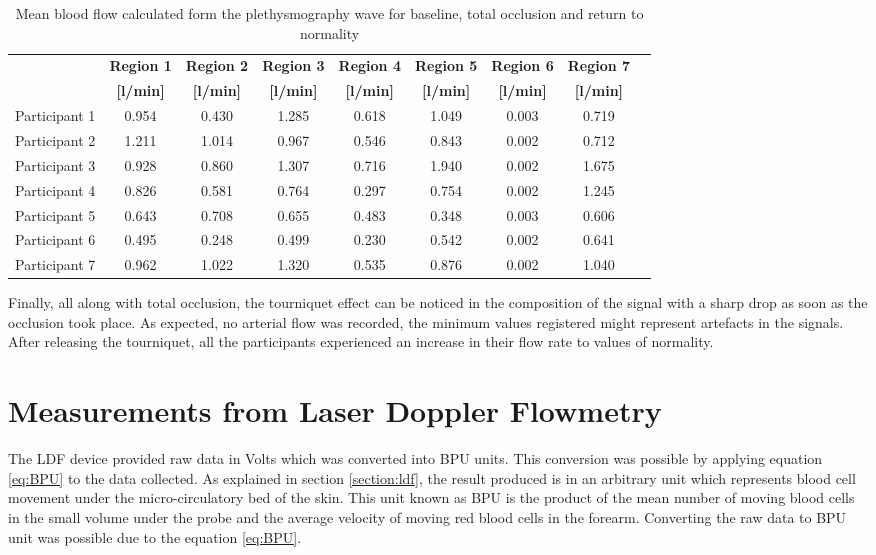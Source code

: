 \begin{table}[!htb]
	\caption{Mean blood flow calculated form the plethysmography wave for baseline, total occlusion and return to normality}
	\label{tbl:DU flow}
	\centering \small
	\begin{tabular}{lcccccccc}
		\toprule
		& \textbf{Region 1}
		& \textbf{Region 2}
		& \textbf{Region 3}
		& \textbf{Region 4}
		& \textbf{Region 5}
		& \textbf{Region 6}
		& \textbf{Region 7} \\
		& \textbf{[\si[per-mode=symbol]{\litre\per\minute}]}
		& \textbf{[\si[per-mode=symbol]{\litre\per\minute}]}
		& \textbf{[\si[per-mode=symbol]{\litre\per\minute}]}
		& \textbf{[\si[per-mode=symbol]{\litre\per\minute}]}
		& \textbf{[\si[per-mode=symbol]{\litre\per\minute}]}
		& \textbf{[\si[per-mode=symbol]{\litre\per\minute}]}
		& \textbf{[\si[per-mode=symbol]{\litre\per\minute}]} \\\midrule	
		Participant 1 & 0.954 & 0.430 & 1.285 & 0.618 & 1.049 & 0.003 & 0.719 \\
		Participant 2 & 1.211 & 1.014 & 0.967 & 0.546 & 0.843 & 0.002 & 0.712 \\  
		Participant 3 & 0.928 & 0.860 & 1.307 & 0.716 & 1.940 & 0.002 & 1.675 \\  
		Participant 4 & 0.826 & 0.581 & 0.764 & 0.297 & 0.754 & 0.002 & 1.245 \\  
		Participant 5 & 0.643 & 0.708 & 0.655 & 0.483 & 0.348 & 0.003 & 0.606 \\  
		Participant 6 & 0.495 & 0.248 & 0.499 & 0.230 & 0.542 & 0.002 & 0.641 \\  
		Participant 7 & 0.962 & 1.022 & 1.320 & 0.535 & 0.876 & 0.002 & 1.040 \\  	 
		\bottomrule
	\end{tabular}
\end{table}

Finally, all along with total occlusion, the tourniquet effect can be noticed in the composition of the signal with a sharp drop as soon as the occlusion took place. As expected, no arterial flow was recorded, the minimum values registered might represent artefacts in the signals. After releasing the tourniquet, all the participants experienced an increase in their flow rate to values of normality. 

\section{Measurements from Laser Doppler Flowmetry}
\label{section comparison 3}
The LDF device provided raw data in Volts which was converted into BPU units. This conversion was possible by applying equation \ref{eq:BPU} to the data collected. As explained in section \ref{section:ldf}, the result produced is in an arbitrary unit which represents blood cell movement under the micro-circulatory bed of the skin. This unit known as BPU is the product of the mean number of moving blood cells in the small volume under the probe and the average velocity of moving red blood cells in the forearm. Converting the raw data to BPU unit was possible due to the equation \ref{eq:BPU}.

